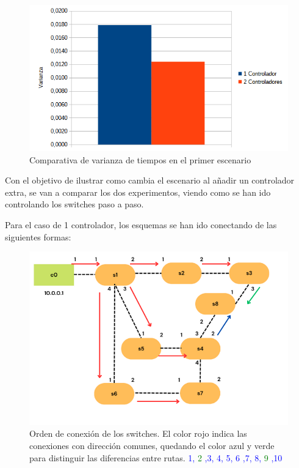 \documentclass[a4paper, 12pt]{book}
\begin{document}
 	\begin{figure}[H]
 		\centering
 		\includegraphics[width=12cm, keepaspectratio]{img/comparativavarianzabucle}
 		\caption{Comparativa de varianza de tiempos en el primer escenario}
 		\label{figura:varianzabucle4}
 	\end{figure}
 	
 	Con el objetivo de ilustrar como cambia el escenario al añadir un controlador extra, se van a comparar los dos experimentos, viendo como se han ido controlando los switches paso a paso.
 	
 	Para el caso de 1 controlador, los esquemas se han ido conectando de las siguientes formas:
 	
 	\begin{figure}[H]
 		\centering
 		\includegraphics[width=12cm, keepaspectratio]{img/rutasEscenario1-1c}
 		\caption{Orden de conexión de los switches. El color rojo indica las conexiones con dirección comunes, quedando el color azul y verde para distinguir las diferencias entre rutas. \textcolor{blue}{1,}  \textcolor{green}{2}  \textcolor{blue}{,3, 4, 5, 6 ,7, 8,}  \textcolor{green}{9} \textcolor{blue}{,10}}
 		\label{figura:escenario1_1c_1}
 	\end{figure}
 	
\end{document}
